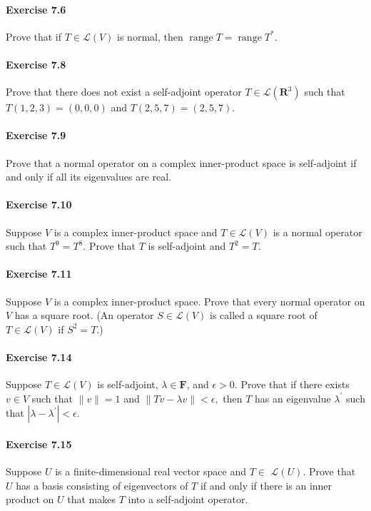 \documentclass{article}
\begin{document}
\paragraph{Exercise 7.6} Prove that if $T \in \mathcal{L}(V)$ is normal, then $\operatorname{range} T=\operatorname{range} T^{*}.$

\paragraph{Exercise 7.8} Prove that there does not exist a self-adjoint operator $T \in \mathcal{L}\left(\mathbf{R}^{3}\right)$ such that $T(1,2,3)=(0,0,0)$ and $T(2,5,7)=(2,5,7)$.

\paragraph{Exercise 7.9} Prove that a normal operator on a complex inner-product space is self-adjoint if and only if all its eigenvalues are real.

\paragraph{Exercise 7.10} Suppose $V$ is a complex inner-product space and $T \in \mathcal{L}(V)$ is a normal operator such that $T^{9}=T^{8}$. Prove that $T$ is self-adjoint and $T^{2}=T$.

\paragraph{Exercise 7.11} Suppose $V$ is a complex inner-product space. Prove that every normal operator on $V$ has a square root. (An operator $S \in \mathcal{L}(V)$ is called a square root of $T \in \mathcal{L}(V)$ if $S^{2}=T$.)

\paragraph{Exercise 7.14} Suppose $T \in \mathcal{L}(V)$ is self-adjoint, $\lambda \in \mathbf{F}$, and $\epsilon>0$. Prove that if there exists $v \in V$ such that $\|v\|=1$ and $\|T v-\lambda v\|<\epsilon,$ then $T$ has an eigenvalue $\lambda^{\prime}$ such that $\left|\lambda-\lambda^{\prime}\right|<\epsilon$.

\paragraph{Exercise 7.15} Suppose $U$ is a finite-dimensional real vector space and $T \in$ $\mathcal{L}(U)$. Prove that $U$ has a basis consisting of eigenvectors of $T$ if and only if there is an inner product on $U$ that makes $T$ into a self-adjoint operator.
\end{document}
